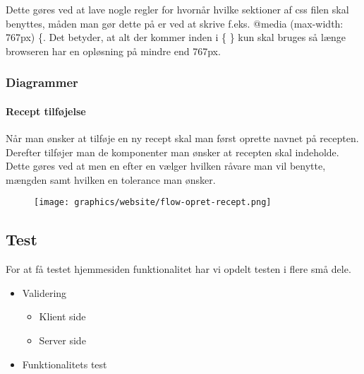 \documentclass[a4paper]{article}
\newenvironment{changemargin}[2]{%
\begin{list}{}{%
\setlength{\topsep}{0pt}%
\setlength{\leftmargin}{#1}%
\setlength{\rightmargin}{#2}%
\setlength{\listparindent}{\parindent}%
\setlength{\itemindent}{\parindent}%
\setlength{\parsep}{\parskip}%
}%
\item[]}{\end{list}}
\begin{document}
Dette gøres ved at lave nogle regler for hvornår hvilke sektioner af css filen skal benyttes, måden man gør dette på er ved at skrive f.eks. @media (max-width: 767px) \{. Det betyder, at alt der kommer inden i \{ \} kun skal bruges så længe browseren har en opløsning på mindre end 767px.


\subsubsection{Diagrammer} %

\paragraph{Recept tilføjelse} %

Når man ønsker at tilføje en ny recept skal man først oprette navnet på recepten. Derefter tilføjer man de komponenter man ønsker at recepten skal indeholde. Dette gøres ved at men en efter en vælger hvilken råvare man vil benytte, mængden samt hvilken en tolerance man ønsker. 

\begin{figure}[H]
  \centering
  \texttt{[image: graphics/website/flow-opret-recept.png]}
  \caption{}
\end{figure}




\subsection{Test} %

For at få testet hjemmesiden funktionalitet har vi opdelt testen i flere små dele.

\begin{itemize}
  \item Validering
    \begin{itemize}
      \item Klient side
      \item Server side
    \end{itemize}
\item Funktionalitets test
\end{itemize}
\end{document}
